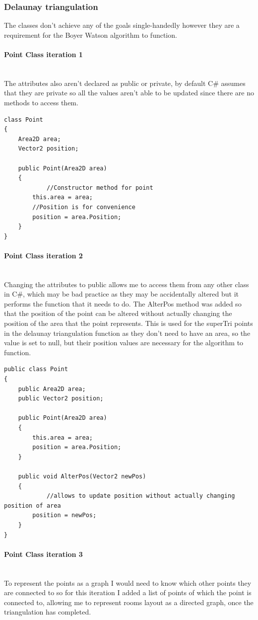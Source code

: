 \documentclass{article}
\newcommand{\parBr}{\vspace{5mm}}%
\newcommand{\myparagraph}[1]{\paragraph{#1}\mbox{}\\} %
\begin{document}
\subsubsection{Delaunay triangulation}
The classes don't achieve any of the goals single-handedly however they are a requirement for the Boyer Watson algorithm \cite{BW_alg} to function.
\myparagraph{Point Class iteration 1}
The attributes also aren't declared as public or private, by default C\# assumes that they are private so all the values aren't able to be updated since there are no methods to access them.
\begin{lstlisting}
class Point
{
    Area2D area;
    Vector2 position;

    public Point(Area2D area)
    {
    		//Constructor method for point
        this.area = area;
        //Position is for convenience
        position = area.Position;
    }
}
\end{lstlisting}

\myparagraph{Point Class iteration 2}
Changing the attributes to public allows me to access them from any other class in C\#, which may be bad practice as they may be accidentally altered but it performs the function that it needs to do.
\parBr
The AlterPos method was added so that the position of the point can be altered without actually changing the position of the area that the point represents. This is used for the superTri points in the delaunay triangulation function as they don't need to have an area, so the value is set to null, but their position values are necessary for the algorithm to function.
\begin{lstlisting}
public class Point
{
    public Area2D area;
    public Vector2 position;

    public Point(Area2D area)
    {
        this.area = area;
        position = area.Position;
    }

    public void AlterPos(Vector2 newPos)
    {
    		//allows to update position without actually changing position of area
        position = newPos;
    }
}
\end{lstlisting}

\myparagraph{Point Class iteration 3}
To represent the points as a graph I would need to know which other points they are connected to so for this iteration I added a list of points of which the point is connected to, allowing me to represent rooms layout as a directed graph, once the triangulation has completed.

\parBr
\end{document}
